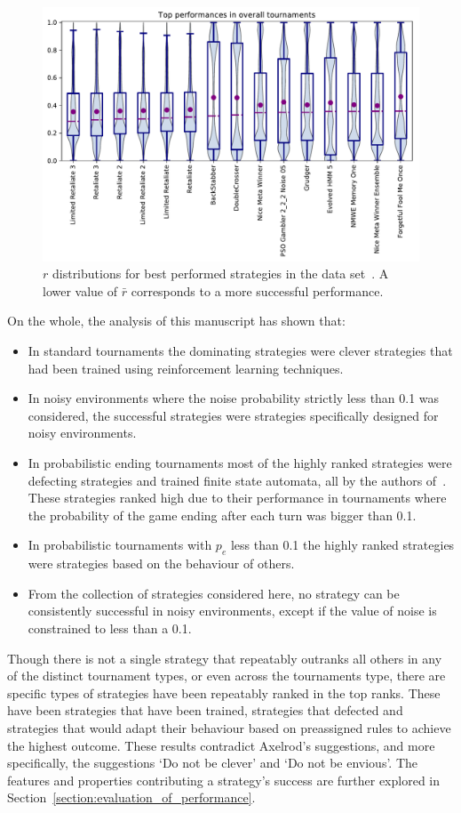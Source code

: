 \documentclass{article}
\begin{document}
\begin{figure}[!htbp]
        \centering
        \includegraphics[width=.65\textwidth]{../images/performance_merged.pdf}
        \caption{\(r\) distributions for best performed strategies in the data set~\cite{data}.
        A lower value of \(\bar{r}\) corresponds to a more successful
        performance.}
        \label{fig:overall_results}
\end{figure}

On the whole, the analysis of this manuscript has shown that:

\begin{itemize}
    \item In standard tournaments the dominating strategies were clever
    strategies that had been trained using reinforcement learning techniques.
    \item In noisy environments where the noise probability strictly less than
    0.1 was considered, the successful strategies were strategies specifically
    designed for noisy environments.
    \item In probabilistic ending tournaments most of the highly ranked
    strategies were defecting strategies and trained finite state automata, all
    by the authors of~\cite{Ashlock2006, Ashlock2014}. These strategies ranked
    high due to their performance in tournaments where the probability of the
    game ending after each turn was bigger than 0.1.
    \item In probabilistic tournaments with \(p_e\) less than 0.1 the highly
    ranked strategies were strategies based on the behaviour of others.
    \item From the collection of strategies considered here,  no strategy can be
    consistently successful in noisy environments, except if the value of noise
    is constrained to less than a 0.1.
\end{itemize}

Though there is not a single strategy that repeatably outranks all others in any
of the distinct tournament types, or even across the tournaments type, there
are specific types of strategies have been repeatably ranked in the top ranks.
These have been strategies that have been trained, strategies that defected
and strategies that would adapt their behaviour based on preassigned rules
to achieve the highest outcome. These results contradict Axelrod's suggestions,
and more specifically, the suggestions `Do not be clever' and `Do not be envious'.
The features and properties contributing a strategy's success are further
explored in Section~\ref{section:evaluation_of_performance}.
\end{document}

